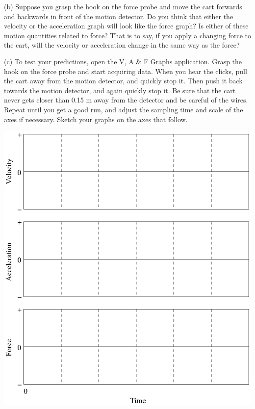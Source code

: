 (b) Suppose you grasp the hook on the force probe and move the cart forwards
and backwards in front of the motion detector. Do you think that either the
velocity or the acceleration graph will look like the force graph? Is either
of these motion quantities related to force? That is to say, if you apply a
changing force to the cart, will the velocity or acceleration change in the
same way as the force?
\answerspace{35mm}

\pagebreak[3]
(c) To test your predictions, open the V, A \& F Graphs application. Grasp the
hook on the force probe and start acquiring data. When you hear the clicks,
pull the cart away from the motion detector, and quickly stop it. Then push
it back towards the motion detector, and again quickly stop it. Be sure that
the cart never gets closer than 0.15 m away from the detector and be careful
of the wires. Repeat until you get a good run, and adjust the sampling time
and scale of the axes if necessary. Sketch your graphs on the axes that follow.

\vspace{0.3cm}
{\par\centering \includegraphics{force1/force1_fig2.eps} \par}
\vspace{0.3cm}

